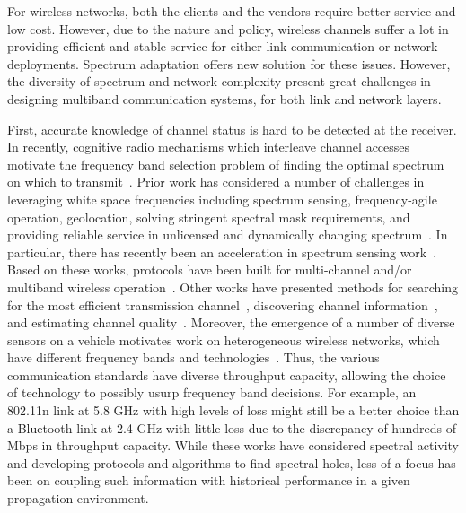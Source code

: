 For wireless networks, both the clients and the vendors require
better service and low cost. However, due to the nature and policy, 
wireless channels suffer a lot in providing efficient and stable service for 
either link communication or network deployments. Spectrum 
adaptation offers new solution for these issues. However, the
diversity of spectrum and network complexity present great
challenges in designing multiband communication systems, 
for both link and network layers.

First, accurate knowledge of channel status is hard to be detected at the receiver. 
In recently, cognitive radio mechanisms which interleave channel accesses motivate the frequency
band selection problem of finding the optimal spectrum on which to 
transmit~\cite{ghasemi2008spectrum}. Prior work has considered a number of challenges in
leveraging white space frequencies including spectrum sensing, frequency-agile operation,
geolocation, solving stringent spectral mask requirements, and providing reliable service
in unlicensed and dynamically changing spectrum~\cite{shellhammer2009technical}. 
In particular, there has recently been an acceleration
in spectrum sensing work~\cite{rayanchu2011fluid, kim1996pulse,cabric2004implementation}. Based on 
these works, protocols have been built for multi-channel and/or multiband wireless operation~\cite{MOAR,
raychaudhuri2003spectrum,sabharwal2007opportunistic}.  Other works have presented methods for searching for the most efficient 
transmission channel~\cite{mo2005comparison}, discovering channel information~\cite{rayanchu2011fluid, sabharwal2007opportunistic}, and estimating 
channel quality~\cite{MOAR}.
Moreover, the emergence of a number of diverse sensors on a vehicle motivates work
on heterogeneous wireless networks, which have different frequency bands and
technologies~\cite{hossain2010vehicular}. Thus, the various communication 
standards have diverse throughput capacity, allowing the choice of technology 
to possibly usurp frequency band decisions. For example, an 802.11n link at 5.8 
GHz with high levels of loss
might still be a better choice than a Bluetooth link at 2.4 GHz with little loss
due to the discrepancy of hundreds of Mbps in throughput capacity.
While these works have considered spectral activity and developing protocols and algorithms to 
find spectral holes, less of a focus has been on coupling such information with historical performance in a given 
propagation environment.


